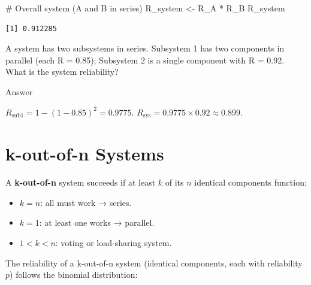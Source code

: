 \documentclass[
  letterpaper,
  DIV=11,
  numbers=noendperiod]{scrreprt}
\newenvironment{Shaded}{\begin{snugshade}}{\end{snugshade}}
\newcommand{\CommentTok}[1]{\textcolor[rgb]{0.37,0.37,0.37}{#1}}
\newcommand{\NormalTok}[1]{\textcolor[rgb]{0.00,0.23,0.31}{#1}}
\newcommand{\OtherTok}[1]{\textcolor[rgb]{0.00,0.23,0.31}{#1}}
\newcommand{\SpecialCharTok}[1]{\textcolor[rgb]{0.37,0.37,0.37}{#1}}
\providecommand{\tightlist}{%
  \setlength{\itemsep}{0pt}\setlength{\parskip}{0pt}}
\begin{document}
\begin{Shaded}
\begin{Highlighting}[]
\CommentTok{\# Overall system (A and B in series)}
\NormalTok{R\_system }\OtherTok{\textless{}{-}}\NormalTok{ R\_A }\SpecialCharTok{*}\NormalTok{ R\_B}
\NormalTok{R\_system}
\end{Highlighting}
\end{Shaded}

\begin{verbatim}
[1] 0.912285
\end{verbatim}

\begin{tcolorbox}[enhanced jigsaw, arc=.35mm, bottomrule=.15mm, bottomtitle=1mm, breakable, colback=white, colbacktitle=quarto-callout-tip-color!10!white, colframe=quarto-callout-tip-color-frame, coltitle=black, left=2mm, leftrule=.75mm, opacityback=0, opacitybacktitle=0.6, rightrule=.15mm, title=\textcolor{quarto-callout-tip-color}{\faLightbulb}\hspace{0.5em}{Review}, titlerule=0mm, toprule=.15mm, toptitle=1mm]

A system has two subsystems in series. Subsystem 1 has two components in
parallel (each R = 0.85); Subsystem 2 is a single component with R =
0.92. What is the system reliability?

Answer

\(R_{\text{sub1}} = 1 - (1 - 0.85)^2 = 0.9775\).
\(R_{\text{sys}} = 0.9775 \times 0.92 \approx 0.899\).

\end{tcolorbox}

\section{k-out-of-n Systems}\label{k-out-of-n-systems}

A \textbf{k-out-of-n} system succeeds if at least \(k\) of its \(n\)
identical components function:

\begin{itemize}
\tightlist
\item
  \(k = n\): all must work → series.
\item
  \(k = 1\): at least one works → parallel.
\item
  \(1 < k < n\): voting or load-sharing system.
\end{itemize}

The reliability of a k-out-of-n system (identical components, each with
reliability \(p\)) follows the binomial distribution:
\end{document}
